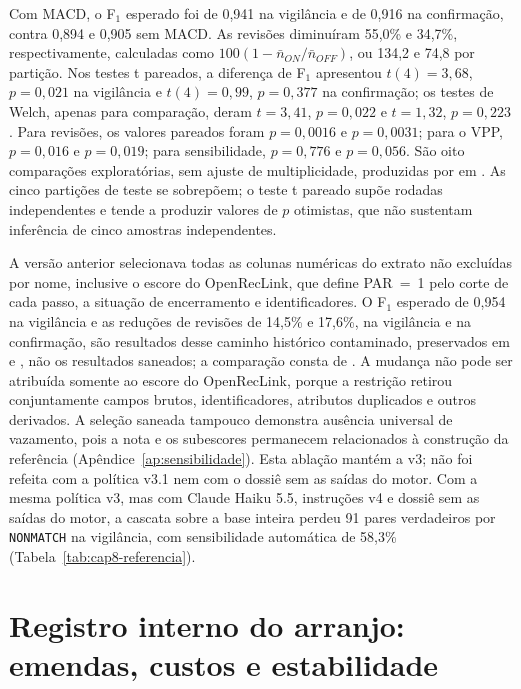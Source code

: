 Com MACD, o F$_1$ esperado foi de 0,941 na vigilância e de 0,916 na confirmação, contra 0,894 e 0,905 sem MACD. As revisões diminuíram 55,0\% e 34,7\%, respectivamente, calculadas como $100(1-\bar n_{ON}/\bar n_{OFF})$, ou 134,2 e 74,8 por partição. Nos testes t pareados, a diferença de F$_1$ apresentou $t(4)=3{,}68$, $p=0{,}021$ na vigilância e $t(4)=0{,}99$, $p=0{,}377$ na confirmação; os testes de Welch, apenas para comparação, deram $t=3{,}41$, $p=0{,}022$ e $t=1{,}32$, $p=0{,}223$. Para revisões, os valores pareados foram $p=0{,}0016$ e $p=0{,}0031$; para o VPP, $p=0{,}016$ e $p=0{,}019$; para sensibilidade, $p=0{,}776$ e $p=0{,}056$. São oito comparações exploratórias, sem ajuste de multiplicidade, produzidas por  em . As cinco partições de teste se sobrepõem; o teste t pareado supõe rodadas independentes e tende a produzir valores de $p$ otimistas, que não sustentam inferência de cinco amostras independentes.

A versão anterior selecionava todas as colunas numéricas do extrato não excluídas por nome, inclusive o escore do OpenRecLink, que define PAR~=~1 pelo corte de cada passo, a situação de encerramento e identificadores. O F$_1$ esperado de 0,954 na vigilância e as reduções de revisões de 14,5\% e 17,6\%, na vigilância e na confirmação, são resultados desse caminho histórico contaminado, preservados em  e , não os resultados saneados; a comparação consta de . A mudança não pode ser atribuída somente ao escore do OpenRecLink, porque a restrição retirou conjuntamente campos brutos, identificadores, atributos duplicados e outros derivados. A seleção saneada tampouco demonstra ausência universal de vazamento, pois a nota e os subescores permanecem relacionados à construção da referência (Apêndice~\ref{ap:sensibilidade}). Esta ablação mantém a v3; não foi refeita com a política v3.1 nem com o dossiê sem as saídas do motor. Com a mesma política v3, mas com Claude Haiku 5.5, instruções v4 e dossiê sem as saídas do motor, a cascata sobre a base inteira perdeu 91 pares verdadeiros por \texttt{NONMATCH} na vigilância, com sensibilidade automática de 58,3\% (Tabela~\ref{tab:cap8-referencia}).

\section{Registro interno do arranjo: emendas, custos e estabilidade}\label{sec:e4-ap-registro}

